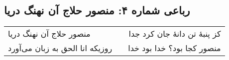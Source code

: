 \begin{center}
\section*{رباعی شماره ۴: منصور حلاج آن نهنگ دریا}
\label{sec:sh004}
\begin{longtable}{l p{0.5cm} r}
منصور حلاج آن نهنگ دریا
&&
کز پنبهٔ تن دانهٔ جان کرد جدا
\\
روزیکه انا الحق به زبان می‌آورد
&&
منصور کجا بود؟ خدا بود خدا
\\
\end{longtable}
\end{center}
